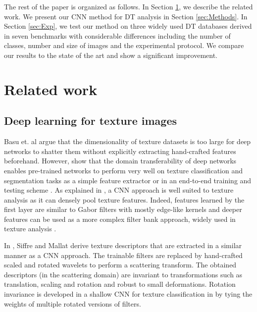 \documentclass[a4paper,11pt]{article}
\begin{document}
The rest of the paper is organized as follows. In Section \ref{sec:RelWork}, we describe the related work. We present our CNN method for DT analysis in Section \ref{sec:Methods}.
In Section \ref{sec:Exp}, we test our method on three widely used DT databases derived in seven benchmarks with considerable differences including the number of classes, number and size of images and the experimental protocol.
We compare our results to the state of the art and show a significant improvement.
\section{Related work}
\label{sec:RelWork}

\subsection{Deep learning for texture images}
Basu et. al \cite{basu2016theoretical} argue that the dimensionality of texture datasets is too large for deep networks to shatter them without explicitly extracting hand-crafted features beforehand.
However, \cite{andrearczyk2016using,cimpoi2014deep,lin2015visualizing} show that the domain transferability of deep networks enables pre-trained networks to perform very well on texture classification and segmentation tasks as a simple feature extractor \cite{cimpoi2014deep} or in an end-to-end training and testing scheme \cite{andrearczyk2016using,lin2015visualizing}.
As explained in \cite{andrearczyk2016using}, a CNN approach is well suited to texture analysis as it can densely pool texture features.
Indeed, features learned by the first layer are similar to Gabor filters with mostly edge-like kernels and deeper features can be used as a more complex filter bank approach, widely used in texture analysis \cite{gonccalves2012spatiotemporal,randen1999filtering}.

In \cite{sifre2013rotation}, Siffre and Mallat derive texture descriptors that are extracted in a similar manner as a CNN approach.
The trainable filters are replaced by hand-crafted scaled and rotated wavelets to perform a scattering transform.
The obtained descriptors (in the scattering domain) are invariant to transformations such as translation, scaling and rotation and robust to small deformations.
Rotation invariance is developed in a shallow CNN for texture classification in \cite{marcos2016learning} by tying the weights of multiple rotated versions of filters.
\end{document}
